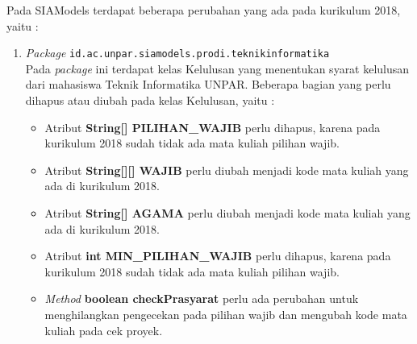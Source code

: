 Pada SIAModels terdapat beberapa perubahan yang ada pada kurikulum 2018, yaitu :
\begin{enumerate}
	\item \textit{Package} \texttt{id.ac.unpar.siamodels.prodi.teknikinformatika}\\
	Pada \textit{package} ini terdapat kelas Kelulusan yang menentukan syarat kelulusan dari mahasiswa Teknik Informatika UNPAR. Beberapa bagian yang perlu dihapus atau diubah pada kelas Kelulusan, yaitu :
	\begin{itemize}
		\item Atribut \textbf{String[] PILIHAN\_WAJIB} perlu dihapus, karena pada kurikulum 2018 sudah tidak ada mata kuliah pilihan wajib.
		\item Atribut \textbf{String[][] WAJIB} perlu diubah menjadi kode mata kuliah yang ada di kurikulum 2018.
		\item Atribut \textbf{String[] AGAMA} perlu diubah menjadi kode mata kuliah yang ada di kurikulum 2018.
		\item Atribut \textbf{int MIN\_PILIHAN\_WAJIB} perlu dihapus, karena pada kurikulum 2018 sudah tidak ada mata kuliah pilihan wajib.
		\item \textit{Method} \textbf{boolean checkPrasyarat} perlu ada perubahan untuk menghilangkan pengecekan pada pilihan wajib dan mengubah kode mata kuliah pada cek proyek.
	\end{itemize}
		

\end{enumerate}
